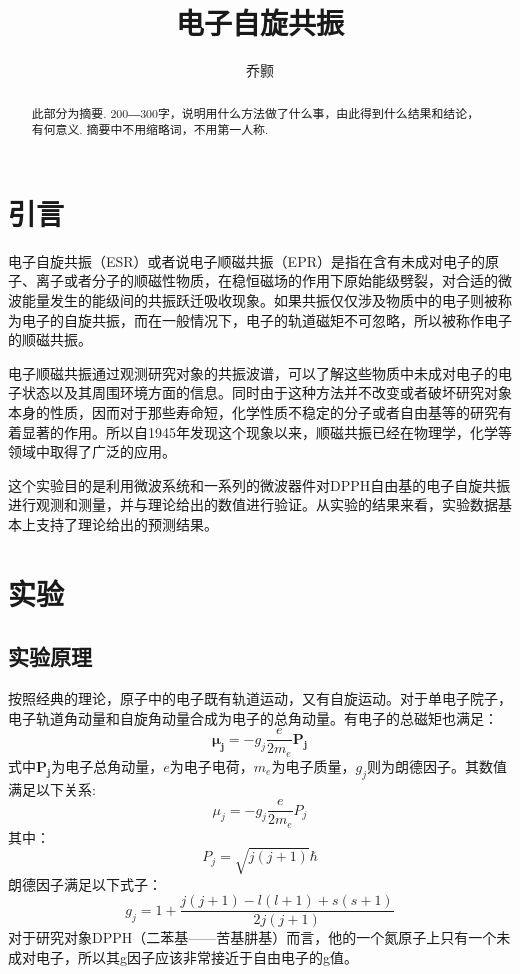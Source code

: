 \documentclass[aps,pre,12pt,preprint,onecolumn,showpacs,showkeys,UTF8]{revtex4-1}
\begin{document}
\title{\bf\heiti{}电子自旋共振\vspace{15mm}}
\author{\fangsong 乔颢\vspace{2mm}}
\begin{abstract}
	\vspace{10mm}
	\begin{spacing}{1.5}
		\songti{}
		此部分为摘要. 200―300字，说明用什么方法做了什么事，由此得到什么结果和结论，有何意义. 摘要中不用缩略词，不用第一人称.
	\end{spacing}
\end{abstract}

\maketitle

\section{引言}
电子自旋共振（ESR）或者说电子顺磁共振（EPR）是指在含有未成对电子的原子、离子或者分子的顺磁性物质，在稳恒磁场的作用下原始能级劈裂，对合适的微波能量发生的能级间的共振跃迁吸收现象。如果共振仅仅涉及物质中的电子则被称为电子的自旋共振，而在一般情况下，电子的轨道磁矩不可忽略，所以被称作电子的顺磁共振。

电子顺磁共振通过观测研究对象的共振波谱，可以了解这些物质中未成对电子的电子状态以及其周围环境方面的信息。同时由于这种方法并不改变或者破坏研究对象本身的性质，因而对于那些寿命短，化学性质不稳定的分子或者自由基等的研究有着显著的作用。所以自1945年发现这个现象以来，顺磁共振已经在物理学，化学等领域中取得了广泛的应用。

这个实验目的是利用微波系统和一系列的微波器件对DPPH自由基的电子自旋共振进行观测和测量，并与理论给出的数值进行验证。从实验的结果来看，实验数据基本上支持了理论给出的预测结果。

\section{实验}
\subsection{实验原理}
按照经典的理论，原子中的电子既有轨道运动，又有自旋运动。对于单电子院子，电子轨道角动量和自旋角动量合成为电子的总角动量。有电子的总磁矩也满足：
\begin{equation}
	\bm{\mu_j}=-g_j\frac{e}{2m_e}\bm{P_j}
\end{equation}
式中$\bm{P_j}$为电子总角动量，$e$为电子电荷，$m_e$为电子质量，$g_j$则为朗德因子。其数值满足以下关系:
\begin{equation}
	\mu_j=-g_j\frac{e}{2m_e}P_j	
\end{equation}
其中：
$$P_j=\sqrt{j(j+1)}\hbar$$
朗德因子满足以下式子：
$$g_j=1+\frac{j(j+1)-l(l+1)+s(s+1)}{2j(j+1)}$$
对于研究对象DPPH（二苯基——苦基肼基）而言，他的一个氮原子上只有一个未成对电子，所以其g因子应该非常接近于自由电子的g值。
\end{document}
